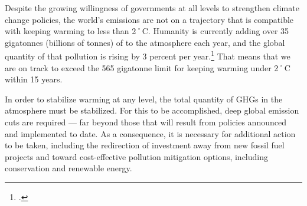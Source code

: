 Despite the growing willingness of governments at all levels to strengthen climate change policies, the world's emissions are not on a trajectory that is compatible with keeping warming to less than 2˚C.
Humanity is currently adding over 35 gigatonnes (billions of tonnes) of  to the atmosphere each year, and the global quantity of that pollution is rising by 3 percent per year.\footcite[][p. 26]{IPCCar4_syr}
That means that we are on track to exceed the 565 gigatonne limit for keeping warming under 2˚C within 15 years.



In order to stabilize warming at any level, the total quantity of GHGs in the atmosphere must be stabilized.
For this to be accomplished, deep global emission cuts are required --- far beyond those that will result from policies announced and implemented to date.
As a consequence, it is necessary for additional action to be taken, including the redirection of investment away from new fossil fuel projects and toward cost-effective pollution mitigation options, including conservation and renewable energy.



